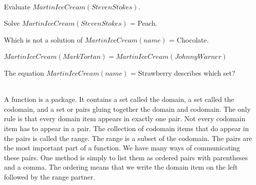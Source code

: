 \documentclass{ximera}
\begin{document}
\quad \\


\begin{question}
Evaluate $MartinIceCream(Steven Stokes)$.
\begin{multipleChoice}
\end{multipleChoice}
\end{question}


\begin{question}
Solve $MartinIceCream(Steven Stokes)$ = Peach.
\begin{multipleChoice}
\end{multipleChoice}
\end{question}



\begin{question}
Which is not a solution of $MartinIceCream(name)$ = Chocolate.
\begin{multipleChoice}
\end{multipleChoice}
\end{question}



\begin{question}
$MartinIceCream(MarkTortan) = MartinIceCream(Johnny Warner)$
\begin{multipleChoice}
\end{multipleChoice}
\end{question}




\begin{question}
The equation $MartinIceCream(name)$ = Strawberry describes which set?
\begin{multipleChoice}
\end{multipleChoice}
\end{question}


\quad \\

A function is a package. It contains a set called the domain, a set called the codomain, and a set or pairs gluing together the domain and codomain. The only rule is that every domain item appears in exactly one pair. Not every codomain item has to appear in a pair.  The collection of codomain items that do appear in the pairs is called the range.  The range is a subset of the codomain. 
The pairs are the most important part of a function. We have many ways of communicating these pairs. One method is simply to list them as ordered pairs with parentheses and a comma.  The ordering means that we write the domain item on the left followed by the range partner. 
\end{document}
